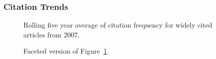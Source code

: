 \documentclass[
  10pt,
  letterpaper,
  DIV=11,
  numbers=noendperiod,
  twoside]{scrartcl}
\begin{document}
\subsubsection*{Citation Trends}\label{citation-trends-31}

\begin{figure}


\caption{\label{fig-citation-spaghetti-2007}Rolling five year average of
citation frequency for widely cited articles from 2007.}

\end{figure}%

\begin{figure}


\caption{\label{fig-citation-facet-2007}Faceted version of
Figure~\ref{fig-citation-spaghetti-2007}.}

\end{figure}%
\end{document}
